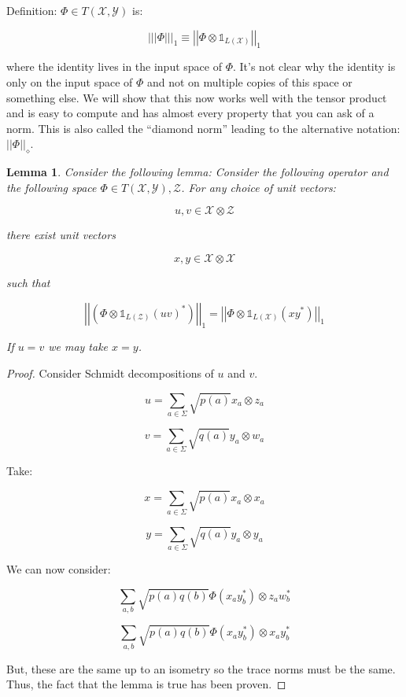 \documentclass{article}
\newtheorem{lemma}{Lemma}
\begin{document}
Definition: $\Phi \in T(\mathcal{X},\mathcal{Y})$ is:

\[ 
    \left| \left| \left| \Phi \right| \right| \right|_1 \equiv \left| \left|
    \Phi \otimes \mathds{1}_{L(\mathcal{X})} \right| \right|_1 
\]

where the identity lives in the input space of $ \Phi $. It's not clear why the
identity is only on the input space of $\Phi$ and not on multiple copies of this
space or something else. We will show that this now works well with the tensor
product and is easy to compute and has almost every property that you can ask of
a norm. This is also called the ``diamond norm'' leading to the alternative
notation: $ \left| \left| \Phi \right| \right|_\diamond $.

\begin{lemma}
Consider the following lemma: Consider the following operator and the following
space $\Phi \in T(\mathcal{X},\mathcal{Y}),
\mathcal{Z}$. For any choice of unit vectors:

\[ 
    u, v \in \mathcal{X} \otimes \mathcal{Z} 
\]

there exist unit vectors

\[ 
    x,y \in \mathcal{X} \otimes \mathcal{X} 
\]

such that

\[ 
    \left| \left| \left( \Phi \otimes \mathds{1}_{L(\mathcal{Z})} (uv)^* \right)
    \right| \right|_1 = \left| \left| \Phi \otimes \mathds{1}_{L(\mathcal{X})}
    (xy^*) \right| \right|_1
\]

If $u=v$ we may take $x=y$.
\end{lemma}

\begin{proof}
    Consider Schmidt decompositions of $u$ and $v$.

    \[ 
    u = \sum_{a\in\Sigma} \sqrt{p(a)} x_a \otimes z_a 
    \]
    
    \[ 
    v = \sum_{a\in\Sigma} \sqrt{q(a)} y_a \otimes w_a 
    \]

    Take:

    \[ 
        x = \sum_{a \in \Sigma} \sqrt{p(a)} x_a \otimes x_a 
    \]
    
    \[ 
        y = \sum_{a \in \Sigma} \sqrt{q(a)} y_a \otimes y_a 
    \]
 
    We can now consider:

    \[ 
        \sum_{a,b} \sqrt{p(a)q(b)} \Phi(x_a y_b^*) \otimes z_a w_b^* 
    \]
    
    
    \[ 
        \sum_{a,b} \sqrt{p(a)q(b)} \Phi(x_a y_b^*) \otimes x_a y_b^* 
    \]

    But, these are the same up to an isometry so the trace norms must be the
    same. Thus, the fact that the lemma is true has been proven.
\end{proof}
\end{document}
